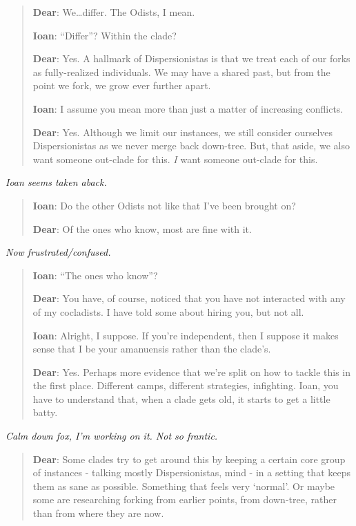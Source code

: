 \begin{quote}
\textbf{Dear}: We\ldots{}differ. The Odists, I mean.

\textbf{Ioan}: ``Differ''? Within the clade?

\textbf{Dear}: Yes. A hallmark of Dispersionistas is that we treat each of our forks as fully-realized individuals. We may have a shared past, but from the point we fork, we grow ever further apart.

\textbf{Ioan}: I assume you mean more than just a matter of increasing conflicts.

\textbf{Dear}: Yes. Although we limit our instances, we still consider ourselves Dispersionistas as we never merge back down-tree. But, that aside, we also want someone out-clade for this. \emph{I} want someone out-clade for this.
\end{quote}

\emph{Ioan seems taken aback.}

\begin{quote}
\textbf{Ioan}: Do the other Odists not like that I've been brought on?

\textbf{Dear}: Of the ones who know, most are fine with it.
\end{quote}

\emph{Now frustrated/confused.}

\begin{quote}
\textbf{Ioan}: ``The ones who know''?

\textbf{Dear}: You have, of course, noticed that you have not interacted with any of my cocladists. I have told some about hiring you, but not all.

\textbf{Ioan}: Alright, I suppose. If you're independent, then I suppose it makes sense that I be your amanuensis rather than the clade's.

\textbf{Dear}: Yes. Perhaps more evidence that we're split on how to tackle this in the first place. Different camps, different strategies, infighting. Ioan, you have to understand that, when a clade gets old, it starts to get a little batty.
\end{quote}

\emph{Calm down fox, I'm working on it. Not so frantic.}

\begin{quote}
\textbf{Dear}: Some clades try to get around this by keeping a certain core group of instances - talking mostly Dispersionistas, mind - in a setting that keeps them as sane as possible. Something that feels very `normal'. Or maybe some are researching forking from earlier points, from down-tree, rather than from where they are now.
\end{quote}

